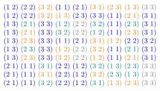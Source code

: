 \begin{xmpl}
$$\begin{tabular}{c}
		\textcolor{blue}{(1 2)} \textcolor{blue}{(2 2)} \textcolor{orange}{(3 2)} \textcolor{blue}{(1 1)} \textcolor{blue}{(2 1)} \textcolor{orange}{(3 1)} \textcolor{orange}{(2 3)} \textcolor{orange}{(1 3)} \textcolor{gray}{(3 3)}\\
		\textcolor{blue}{(1 2)} \textcolor{blue}{(2 2)} \textcolor{orange}{(3 2)} \textcolor{orange}{(1 3)} \textcolor{blue}{(2 3)} \textcolor{blue}{(3 3)} \textcolor{blue}{(1 1)} \textcolor{orange}{(2 1)} \textcolor{blue}{(3 1)}\\
		\textcolor{blue}{(1 3)} \textcolor{teal}{(2 1)} \textcolor{blue}{(3 3)} \textcolor{teal}{(1 2)} \textcolor{gray}{(2 2)} \textcolor{teal}{(3 2)} \textcolor{blue}{(1 1)} \textcolor{teal}{(2 3)} \textcolor{blue}{(3 1)}\\
		\textcolor{blue}{(1 3)} \textcolor{orange}{(2 1)} \textcolor{blue}{(3 3)} \textcolor{teal}{(3 2)} \textcolor{gray}{(2 2)} \textcolor{teal}{(1 2)} \textcolor{blue}{(1 1)} \textcolor{orange}{(2 3)} \textcolor{blue}{(3 1)}\\
		\textcolor{blue}{(1 3)} \textcolor{orange}{(2 3)} \textcolor{blue}{(3 3)} \textcolor{blue}{(1 1)} \textcolor{blue}{(2 1)} \textcolor{orange}{(3 1)} \textcolor{orange}{(1 2)} \textcolor{blue}{(2 2)} \textcolor{blue}{(3 2)}\\
		\textcolor{blue}{(1 3)} \textcolor{teal}{(2 3)} \textcolor{blue}{(3 3)} \textcolor{orange}{(1 2)} \textcolor{gray}{(2 2)} \textcolor{orange}{(3 2)} \textcolor{blue}{(1 1)} \textcolor{teal}{(2 1)} \textcolor{blue}{(3 1)}\\
		\textcolor{blue}{(1 3)} \textcolor{orange}{(2 3)} \textcolor{blue}{(3 3)} \textcolor{orange}{(3 2)} \textcolor{gray}{(2 2)} \textcolor{orange}{(1 2)} \textcolor{blue}{(1 1)} \textcolor{orange}{(2 1)} \textcolor{blue}{(3 1)}\\
		\textcolor{blue}{(2 1)} \textcolor{blue}{(1 1)} \textcolor{teal}{(3 1)} \textcolor{blue}{(2 2)} \textcolor{blue}{(1 2)} \textcolor{teal}{(3 2)} \textcolor{teal}{(1 3)} \textcolor{teal}{(2 3)} \textcolor{gray}{(3 3)}\\
		\textcolor{blue}{(2 1)} \textcolor{blue}{(1 1)} \textcolor{orange}{(3 1)} \textcolor{blue}{(2 2)} \textcolor{blue}{(1 2)} \textcolor{orange}{(3 2)} \textcolor{teal}{(2 3)} \textcolor{teal}{(1 3)} \textcolor{gray}{(3 3)}\\
		\textcolor{blue}{(2 1)} \textcolor{blue}{(1 1)} \textcolor{teal}{(3 2)} \textcolor{blue}{(2 2)} \textcolor{blue}{(1 2)} \textcolor{teal}{(3 1)} \textcolor{orange}{(1 3)} \textcolor{orange}{(2 3)} \textcolor{gray}{(3 3)}\\

\end{tabular}$$
\end{xmpl}
